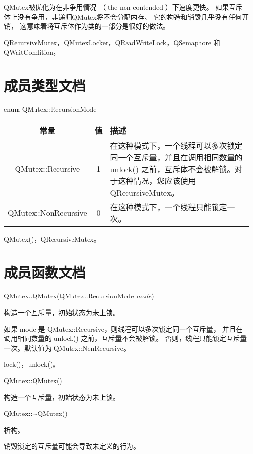 QMutex被优化为在非争用情况 （ the non-contended ）下速度更快。
如果互斥体上没有争用，非递归QMutex将不会分配内存。
它的构造和销毁几乎没有任何开销，
这意味着将互斥体作为类的一部分是很好的做法。

\begin{seeAlso}
QRecursiveMutex，QMutexLocker，QReadWriteLock，QSemaphore 和 QWaitCondition。
\end{seeAlso}

\section{成员类型文档}

enum QMutex::RecursionMode

\begin{tabular}{|c|c|m{20em}|}
\hline
常量 	&值& 	描述 \\ 
\hline
QMutex::Recursive &	1 	&在这种模式下，一个线程可以多次锁定同一个互斥量，并且在调用相同数量的 unlock() 之前，互斥体不会被解锁。对于这种情况，您应该使用 QRecursiveMutex。 \\
\hline
QMutex::NonRecursive &	0 	&在这种模式下，一个线程只能锁定一次。\\
\hline
\end{tabular}

\begin{seeAlso}
QMutex()，QRecursiveMutex。
\end{seeAlso}

\section{成员函数文档}

QMutex::QMutex(QMutex::RecursionMode \emph{mode})

构造一个互斥量，初始状态为未上锁。

如果 mode 是 QMutex::Recursive，则线程可以多次锁定同一个互斥量，
并且在调用相同数量的 unlock() 之前，互斥量不会被解锁。
否则，线程只能锁定互斥量一次。默认值为 QMutex::NonRecursive。

\begin{seeAlso}
lock()，unlock()。
\end{seeAlso}

QMutex::QMutex()

构造一个互斥量，初始状态为未上锁。

QMutex::$\sim$QMutex()

析构。

\begin{warning}
销毁锁定的互斥量可能会导致未定义的行为。
\end{warning}

